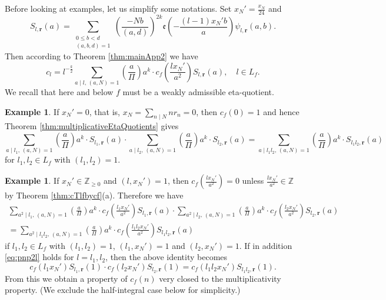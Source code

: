 \documentclass[12pt]{amsart}
\numberwithin{equation}{section}
\theoremstyle{plain}
\theoremstyle{definition}
\newtheorem{examp}[thm]{Example}
\theoremstyle{remark}
\newcommand\twoscript[2]{\substack{{#1} \\ {#2}}}
\newcommand\legendre[2]{\genfrac{(}{)}{}{}{#1}{#2}}
\newcommand\etp[1]{\mathfrak{e}\left(#1\right)}
\newcommand\numZ{\mathbb{Z}}
\newcommand\numgeq[2]{\mathbb{#1}_{\geq #2}}
\begin{document}
Before looking at examples, let us simplify some notations. Set $x_N'=\frac{x_N}{24}$ and
\begin{equation*}
S_{l,\mathbf{r}}(a)=\sum_{\twoscript{0\leq b<d}{(a,b,d)=1}}\legendre{-Nb}{(a,d)}^{2k}\etp{-\frac{(l-1)x_N'b}{a}}\psi_{l,\mathbf{r}}(a,b).
\end{equation*}
Then according to Theorem \ref{thm:mainApp2} we have
\begin{equation*}
c_l=l^{-\frac{k}{2}}\sum_{a\mid l,\,(a,N)=1}\legendre{a}{\varPi}a^k\cdot c_f\left(\frac{lx_N'}{a^2}\right)S_{l,\mathbf{r}}(a),\quad l\in L_f.
\end{equation*}
We recall that here and below $f$ must be a weakly admissible eta-quotient.
\begin{examp}
If $x_N'=0$, that is, $x_N=\sum_{n\mid N}nr_n=0$, then $c_f(0)=1$ and hence Theorem \ref{thm:multiplicativeEtaQuotients} gives
\begin{equation*}
\sum_{a\mid l_1,\,(a,N)=1}\legendre{a}{\varPi}a^k\cdot S_{l_1,\mathbf{r}}(a)\cdot\sum_{a\mid l_2,\,(a,N)=1}\legendre{a}{\varPi}a^k\cdot S_{l_2,\mathbf{r}}(a)=\sum_{a\mid l_1l_2,\,(a,N)=1}\legendre{a}{\varPi}a^k\cdot S_{l_1l_2,\mathbf{r}}(a)
\end{equation*}
for $l_1,l_2\in L_f$ with $(l_1,l_2)=1$.
\end{examp}

\begin{examp}
If $x_N'\in\numgeq{Z}{0}$ and $(l,x_N')=1$, then $c_f\left(\frac{lx_N'}{a^2}\right)=0$ unless $\frac{lx_N'}{a^2}\in\numZ$ by Theorem \ref{thm:cTlfbycf}(a). Therefore we have
\begin{multline*}
\sum_{a^2\mid l_1,\,(a,N)=1}\legendre{a}{\varPi}a^k\cdot c_f\left(\frac{l_1x_N'}{a^2}\right)S_{l_1,\mathbf{r}}(a)\cdot\sum_{a^2\mid l_2,\,(a,N)=1}\legendre{a}{\varPi}a^k\cdot c_f\left(\frac{l_2x_N'}{a^2}\right)S_{l_2,\mathbf{r}}(a)\\
=\sum_{a^2\mid l_1l_2,\,(a,N)=1}\legendre{a}{\varPi}a^k\cdot c_f\left(\frac{l_1l_2x_N'}{a^2}\right)S_{l_1l_2,\mathbf{r}}(a)
\end{multline*}
if $l_1,l_2\in L_f$ with $(l_1,l_2)=1$, $(l_1,x_N')=1$ and $(l_2,x_N')=1$. If in addition \eqref{eq:pnp2l} holds for $l=l_1,l_2$, then the above identity becomes
\begin{equation}
\label{eq:cfl1l2xNDecomp}
c_f(l_1x_N')S_{l_1,\mathbf{r}}(1)\cdot c_f(l_2x_N')S_{l_2,\mathbf{r}}(1)=c_f(l_1l_2x_N')S_{l_1l_2,\mathbf{r}}(1).
\end{equation}
From this we obtain a property of $c_f(n)$ very closed to the multiplicativity property. (We exclude the half-integral case below for simplicity.)
\end{examp}
\end{document}
